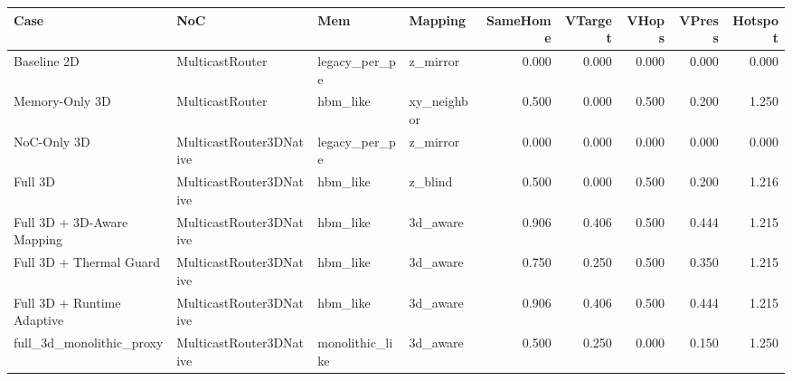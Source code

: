 \begin{tabular}{l l l l r r r r r}
\hline
Case & NoC & Mem & Mapping & SameHome & VTarget & VHops & VPress & Hotspot \\
\hline
Baseline 2D & MulticastRouter & legacy\_per\_pe & z\_mirror & 0.000 & 0.000 & 0.000 & 0.000 & 0.000 \\
Memory-Only 3D & MulticastRouter & hbm\_like & xy\_neighbor & 0.500 & 0.000 & 0.500 & 0.200 & 1.250 \\
NoC-Only 3D & MulticastRouter3DNative & legacy\_per\_pe & z\_mirror & 0.000 & 0.000 & 0.000 & 0.000 & 0.000 \\
Full 3D & MulticastRouter3DNative & hbm\_like & z\_blind & 0.500 & 0.000 & 0.500 & 0.200 & 1.216 \\
Full 3D + 3D-Aware Mapping & MulticastRouter3DNative & hbm\_like & 3d\_aware & 0.906 & 0.406 & 0.500 & 0.444 & 1.215 \\
Full 3D + Thermal Guard & MulticastRouter3DNative & hbm\_like & 3d\_aware & 0.750 & 0.250 & 0.500 & 0.350 & 1.215 \\
Full 3D + Runtime Adaptive & MulticastRouter3DNative & hbm\_like & 3d\_aware & 0.906 & 0.406 & 0.500 & 0.444 & 1.215 \\
full\_3d\_monolithic\_proxy & MulticastRouter3DNative & monolithic\_like & 3d\_aware & 0.500 & 0.250 & 0.000 & 0.150 & 1.250 \\
\hline
\end{tabular}
